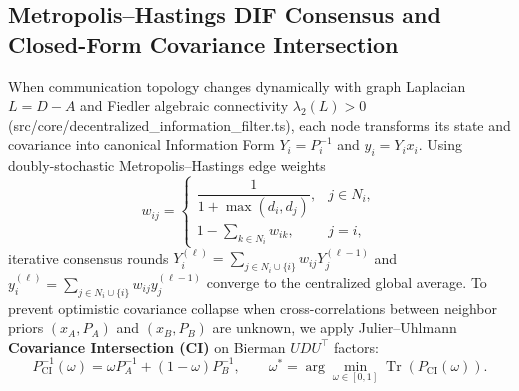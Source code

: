 \documentclass[11pt,a4paper,reqno]{article}
\def\bm#1{#1}%
\def\texttt#1{#1}%
\def\mathcal#1{#1}%
\theoremstyle{plain}
\theoremstyle{definition}
\theoremstyle{remark}
\numberwithin{equation}{section}
\begin{document}
\subsection{Metropolis--Hastings DIF Consensus and Closed-Form Covariance Intersection}
When communication topology changes dynamically with graph Laplacian $\bm{L} = \bm{D} - \bm{A}$ and Fiedler algebraic connectivity $\lambda_2(\bm{L}) > 0$ (\texttt{src/core/decentralized\_information\_filter.ts}), each node transforms its state and covariance into canonical Information Form $\bm{Y}_i = \bm{P}_i^{-1}$ and $\bm{y}_i = \bm{Y}_i \bm{x}_i$. Using doubly-stochastic Metropolis--Hastings edge weights
\begin{equation}
  w_{ij} = \begin{cases}
    \dfrac{1}{1 + \max(d_i, d_j)}, & j \in \mathcal{N}_i, \\[0.8em]
    1 - \displaystyle\sum_{k \in \mathcal{N}_i} w_{ik}, & j = i,
  \end{cases}
  \label{eq:metropolis_hastings}
\end{equation}
iterative consensus rounds $\bm{Y}_i^{(\ell)} = \sum_{j \in \mathcal{N}_i \cup \{i\}} w_{ij} \bm{Y}_j^{(\ell-1)}$ and $\bm{y}_i^{(\ell)} = \sum_{j \in \mathcal{N}_i \cup \{i\}} w_{ij} \bm{y}_j^{(\ell-1)}$ converge to the centralized global average. To prevent optimistic covariance collapse when cross-correlations between neighbor priors $(\bm{x}_A, \bm{P}_A)$ and $(\bm{x}_B, \bm{P}_B)$ are unknown, we apply Julier--Uhlmann \textbf{Covariance Intersection (CI)} on Bierman $\bm{U}\bm{D}\bm{U}^\top$ factors:
\begin{equation}
  \bm{P}_{\text{CI}}^{-1}(\omega) = \omega \bm{P}_A^{-1} + (1 - \omega)\bm{P}_B^{-1}, \qquad \omega^* = \arg\min_{\omega \in [0,1]} \operatorname{Tr}\!\left(\bm{P}_{\text{CI}}(\omega)\right).
  \label{eq:ci_fusion}
\end{equation}
\end{document}
